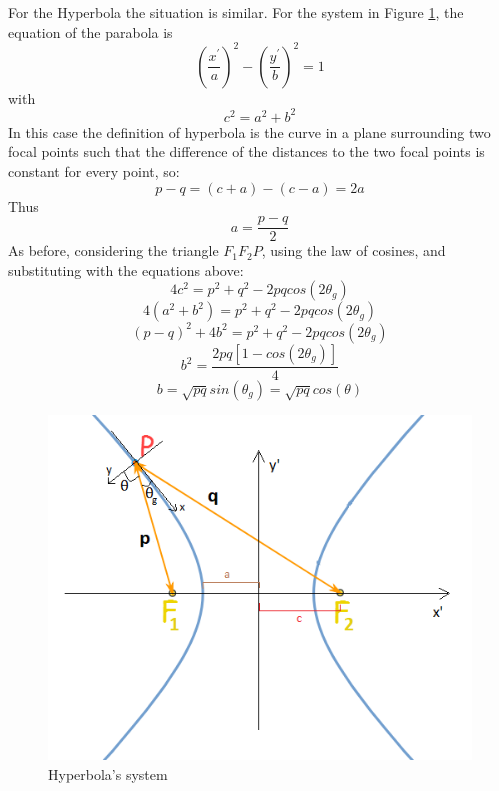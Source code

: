 For the Hyperbola the situation is similar. For the system in Figure \ref{fig: System hyperbola AppendixB}, the equation of the parabola is
\begin{equation}
\left( \frac{x^{'}}{a} \right)^2 - \left( \frac{y^{'}}{b} \right)^2 = 1
\end{equation}
with
\begin{equation}
c^2 = a^2 + b^2
\end{equation}
In this case the definition of hyperbola is the curve in a plane surrounding two focal points such that the difference of the distances to the two focal points is constant for every point, so:
\begin{equation}
p - q = (c + a) - (c - a) = 2 a
\end{equation}
Thus
\begin{equation}
a = \frac{p - q}{2}
\end{equation}
As before, considering the triangle $F_1 F_2 P $, using the law of cosines, and substituting with the equations above:
\begin{equation}
4 c^2 = p^2 + q^2 - 2 p q cos (2 \theta_g)
\end{equation}
\begin{equation}
4 (a^2 + b^2) = p^2 + q^2 - 2 p q cos ( 2 \theta_g)
\end{equation} 
\begin{equation}
(p - q)^2 + 4 b^2 = p^2 + q^2 - 2 p q cos (2 \theta_g)
\end{equation}
\begin{equation}
b^2 = \frac{2 p q [1 - cos (2 \theta_g)]}{4}
\end{equation}
\begin{equation}
b = \sqrt{p q} sin (\theta_g) = \sqrt{p q} cos (\theta)
\end{equation}
\begin{figure}[H]
%
\centering
%
\includegraphics[width=.8\textwidth]{Immagini/AppendixB/Hyperbola}
%
\caption{Hyperbola's system}
%
\label{fig: System hyperbola AppendixB}
%
\end{figure}
